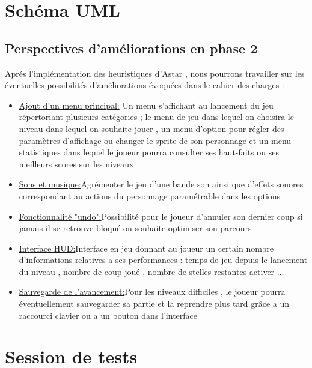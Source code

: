 \documentclass{article}
\begin{document}
	\section{Schéma UML}
	\newpage
	\begin{center}
	\section{Perspectives d'améliorations en phase 2}
	\end{center}
	\vspace{1cm}
	 Aprés l'implémentation des heuristiques d'Astar , nous pourrons travailler sur les éventuelles possibilités d'améliorations évoquées dans le cahier des charges :
	 \vspace{0.5cm}
	 \begin{itemize}
	 	\item\underline{Ajout d'un menu principal:} Un menu s'affichant au lancement du jeu répertoriant plusieurs catégories ; le menu de jeu dans lequel on choisira le niveau dans lequel on souhaite jouer , un menu d'option pour régler des paramètres d'affichage ou changer le sprite de son personnage et un menu statistiques dans lequel le joueur pourra consulter ses haut-faits ou ses meilleurs scores sur les niveaux
	 	\vspace{0.5cm}
	 	\item\underline{Sons et musique:}Agrémenter le jeu d'une bande son ainsi que d'effets sonores correspondant au actions du personnage paramétrable  dans les options 
	 	\vspace{0.5cm}
	 	\item\underline{Fonctionnalité "undo":}Possibilité pour le joueur d'annuler son dernier coup si jamais il se retrouve bloqué ou souhaite optimiser son parcours
	 	\vspace{0.5cm}
	 	\item\underline{Interface HUD:}Interface en jeu donnant au joueur un certain nombre d'informations relatives a ses performances : temps de jeu depuis le lancement du niveau , nombre de coup joué , nombre de stelles restantes activer ...
	 	\vspace{0.5cm}
	 	\item\underline{Sauvegarde de l'avancement:}Pour les niveaux difficiles , le joueur pourra éventuellement sauvegarder sa partie et la reprendre plus tard grâce a un raccourci clavier ou a un bouton dans l'interface
	 \end{itemize}
	\newpage
	\section{Session de tests}
	\newpage
	
\end{document}
